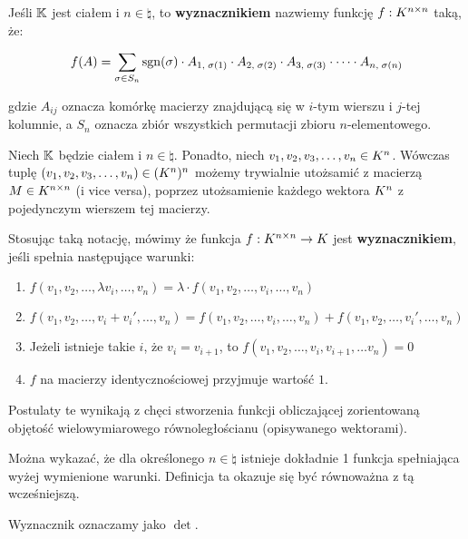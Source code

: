 \begin{definition}
Jeśli \(\mathbb{K}\) jest ciałem i \(n \in \natural\), to \textbf{wyznacznikiem} nazwiemy funkcję \(f : K^{n \times n}\) taką, że:

\[
f(A) = \sum_{\sigma \in S_n} \operatorname{sgn}(\sigma) \cdot A_{1, \; \sigma(1)} \cdot A_{2, \; \sigma(2)} \cdot A_{3, \; \sigma(3)} \cdot \dots \cdot A_{n, \; \sigma(n)} 
\]

gdzie \(A_{ij}\) oznacza komórkę macierzy znajdującą się w \(i\)-tym wierszu i \(j\)-tej kolumnie, a \(S_n\) oznacza zbiór wszystkich permutacji zbioru \(n\)-elementowego.

\end{definition}

\begin{definition}
Niech \(\mathbb{K}\) będzie ciałem i \(n \in \natural\). Ponadto, niech \(v_1, v_2, v_3, \dots, v_n \in K^{n}\). Wówczas tuplę \((v_1, v_2, v_3, \dots, v_n) \in (K^{n})^{n}\) możemy trywialnie utożsamić z macierzą \(M \in K^{n \times n}\) (i vice versa), poprzez utożsamienie każdego wektora \(K^{n}\) z pojedynczym wierszem tej macierzy.

Stosując taką notację, mówimy że funkcja \(f: K^{n \times n} \rightarrow K\) jest \textbf{wyznacznikiem}, jeśli spełnia następujące warunki: 

\begin{enumerate}
    \item \(f(v_1, v_2, \dots, \lambda v_i, \dots, v_n) = \lambda \cdot f(v_1, v_2, \dots, v_i, \dots, v_n) \)
    \item \(f(v_1, v_2, \dots, v_i + v_{i}', \dots, v_n) = f(v_1, v_2, \dots, v_i, \dots, v_n) + f(v_1, v_2, \dots, v_{i}', \dots, v_n) \)
    \item Jeżeli istnieje takie \(i\), że \(v_i = v_{i+1}\), to \(f(v_1, v_2, \dots, v_i, v_{i+1}, \dots v_n) = 0\)
    \item \(f\) na macierzy identycznościowej przyjmuje wartość \(1\). 
\end{enumerate}

Postulaty te wynikają z chęci stworzenia funkcji obliczającej zorientowaną objętość wielowymiarowego równoległościanu (opisywanego wektorami).

Można wykazać, że dla określonego \(n \in \natural\) istnieje dokładnie 1 funkcja spełniająca wyżej wymienione warunki. Definicja ta okazuje się być równoważna z tą wcześniejszą.

\end{definition}

Wyznacznik oznaczamy jako \(\det\).